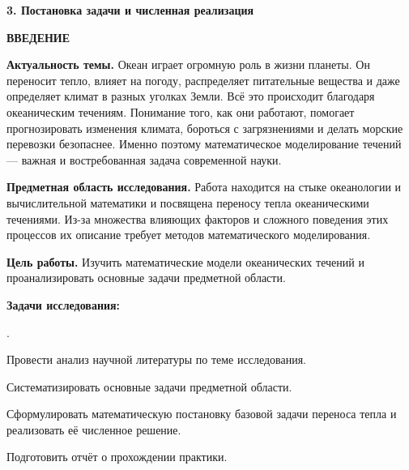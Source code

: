 \documentclass[a4paper,14pt]{extarticle}
\begin{document}
\vspace{0.3cm}
\noindent \textbf{3. Постановка задачи и численная реализация}

\vspace{0.3cm}
\newpage


\begin{center}
    \textbf{\Large ВВЕДЕНИЕ}
\end{center}

\noindent \textbf{Актуальность темы.} Океан играет огромную роль в жизни планеты. Он переносит тепло, влияет на погоду, распределяет питательные вещества и даже определяет климат в разных уголках Земли. Всё это происходит благодаря океаническим течениям. Понимание того, как они работают, помогает прогнозировать изменения климата, бороться с загрязнениями и делать морские перевозки безопаснее. Именно поэтому математическое моделирование течений — важная и востребованная задача современной науки.

\noindent \textbf{Предметная область исследования.} Работа находится на стыке океанологии и вычислительной математики и посвящена переносу тепла океаническими течениями. Из-за множества влияющих факторов и сложного поведения этих процессов их описание требует методов математического моделирования.

\noindent \textbf{Цель работы.} Изучить математические модели океанических течений и проанализировать основные задачи предметной области. 

\noindent \textbf{Задачи исследования:}
\begin{list}{.}{
    \setlength{\leftmargin}{1.25cm}
    \setlength{\labelsep}{0.5em}
    \setlength{\itemsep}{2pt}
    \setlength{\parsep}{0pt}
    \setlength{\topsep}{0pt}
}
    \item Провести анализ научной литературы по теме исследования.
    \item Систематизировать основные задачи предметной области.
    \item Сформулировать математическую постановку базовой задачи переноса тепла и реализовать её численное решение.
    \item Подготовить отчёт о прохождении практики.
\end{list}
\end{document}
